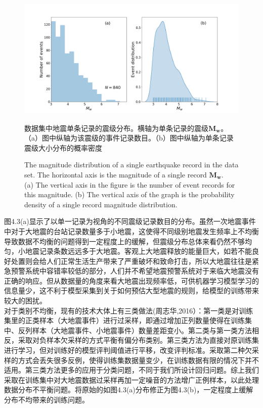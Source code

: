 \begin{figure}[!h] 
\centering 
\includegraphics[width=0.95\linewidth]{img/Event_distribution.png}
\renewcommand{\figurename}{图} 
\caption{数据集中地震单条记录的震级分布。横轴为单条记录的震级$\mathbf{M}_{\mathbf{w}}$。\\
（a）图中纵轴为该震级的事件记录数目。（b）图中纵轴为单条记录震级大小分布的概率密度} 
\addtocounter{figure}{-1} \vspace{-5pt} 
\renewcommand{\figurename}{Fig} 
\caption{The magnitude distribution of a single earthquake record in the data set. The horizontal axis is the magnitude of a single record $\mathbf{M}_{\mathbf{w}}$. \\
(a) The vertical axis in the figure is the number of event records for this magnitude. (b) The vertical axis of the graph is the probability density of a single record magnitude distribution.
} 
\renewcommand{\figurename}{图} 
\label{fig:network-device-influence.png} 
\end{figure}
\indent 图4.3(a)显示了以单一记录为视角的不同震级记录数目的分布。虽然一次地震事件中对于大地震的台站记录数量多于小地震，这使得不同级别地震发生频率上不均衡导致数据不均衡的问题得到一定程度上的缓解，但震级分布总体来看仍然不够均匀，小地震记录条数远远多于大地震。客观上大地震释放的能量巨大，如若不能良好处置则会给人们正常生活生产带来了严重破坏和致命打击，所以大地震往往是紧急预警系统中容错率较低的部分，人们并不希望地震预警系统对于来临大地震没有正确的响应。但从数据量的角度来看大地震出现频率低，可供机器学习模型学习的信息量少，这不利于模型采集到关于如何预估大型地震的规则，给模型的训练带来较大的困扰。\\
\indent 对于类别不均衡，现有的技术大体上有三类做法(周志华,2016）：第一类是对训练集里的正类样本（大地震事件）进行过采样，即通过增加正列数量使得在训练集中、反列样本（大地震事件、小地震事件）数量差距变小。第二类与第一类方法相反，采取对负样本欠采样的方式平衡有偏分布类别。第三类方法为直接对原训练集进行学习，但对训练好的模型评判阈值进行平移，改变评判标准。采取第二种欠采样的方式会丢失很多反例，使得训练集数据量变少，在训练数据有限的情况下并不适用。第三类方法更多的应用于分类问题，不同于我们所设计回归问题。综上我们采取在训练集中对大地震数据过采样再加一定噪音的方法增广正例样本，以此处理数据分布不平衡问题。将原始的如图4.3(a)分布修正为图4.3(b)，一定程度上缓解分布不均带来的训练问题。\\
